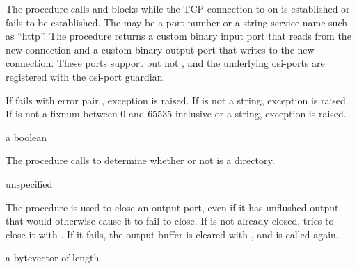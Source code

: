 The  procedure calls  and
blocks while the TCP connection to  on 
is established or fails to be established.  The  may be
a port number or a string service name such as ``http''. The procedure
returns a custom binary input port that reads from the new connection
and a custom binary output port that writes to the new
connection. These ports support  but not
, and the underlying osi-ports are registered
with the osi-port guardian.

If  fails with error pair , exception  is
raised.  If  is not a string, exception  is raised. If  is not a
fixnum between 0 and 65535 inclusive or a string, exception
 is raised.

\begin{procedure}
\end{procedure}
\returns{} a boolean

The  procedure calls  to
determine whether or not  is a directory.

\begin{procedure}
\end{procedure}
\returns{} unspecified

The  procedure is used to close an
output port, even if it has unflushed output that would otherwise
cause it to fail to close.  If  is not already closed,
 tries to close it with
. If it fails, the output buffer is
cleared with , and
 is called again.

\begin{procedure}
\end{procedure}
\returns{} a bytevector of length 

